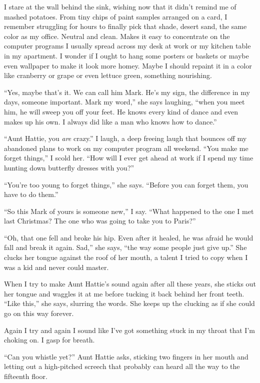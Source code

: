 \documentclass[
]{article}
\begin{document}
I stare at the wall behind the sink, wishing now that it didn't remind
me of mashed potatoes. From tiny chips of paint samples arranged on a
card, I remember struggling for hours to finally pick that shade, desert
sand, the same color as my office. Neutral and clean. Makes it easy to
concentrate on the computer programs I usually spread across my desk at
work or my kitchen table in my apart­ment. I wonder if I ought to hang
some posters or baskets or maybe even wallpaper to make it look more
homey. Maybe I should repaint it in a color like cranberry or grape or
even lettuce green, some­thing nourishing.

``Yes, maybe that's it. We can call him Mark. He's my sign, the
difference in my days, some­one important. Mark my word,'' she says
laughing, ``when you meet him, he will sweep you off your feet. He knows
every kind of dance and even makes up his own. I always did like a man
who knows how to dance.''

``Aunt Hattie, you \emph{are} crazy.'' I laugh, a deep freeing laugh
that bounces off my abandoned plans to work on my computer program all
weekend. ``You make me forget things,'' I scold her. ``How will I ever
get ahead at work if I spend my time hunting down butterfly dresses with
you?''

``You're too young to forget things,'' she says. ``Before you can forget
them, you have to do them.''

``So this Mark of yours is someone new,'' I say. ``What happened to the
one I met last Christ­mas? The one who was going to take you to Paris?''

``Oh, that one fell and broke his hip. Even after it healed, he was
afraid he would fall and break it again. Sad,'' she says, ``the way some
people just give up.'' She clucks her tongue against the roof of her
mouth, a talent I tried to copy when I was a kid and never could master.

When I try to make Aunt Hattie's sound again after all these years, she
sticks out her tongue and waggles it at me before tucking it back behind
her front teeth. ``Like this,'' she says, slurring the words. She keeps
up the clucking as if she could go on this way forever.

Again I try and again I sound like I've got something stuck in my throat
that I'm choking on. I gasp for breath.

``Can you whistle yet?'' Aunt Hattie asks, sticking two fingers in her
mouth and letting out a high-pitched screech that probably can heard all
the way to the fifteenth floor.
\end{document}
